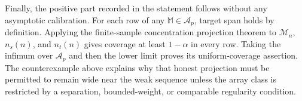Finally, the positive part recorded in the statement follows without any asymptotic calibration.  For each row of any \(\mathbb M\in\mathcal A_p\), target span holds by definition.  Applying the finite-sample concentration projection theorem to \(\mathcal M_n\), \(n_s(n)\), and \(n_t(n)\) gives coverage at least \(1-\alpha\) in every row.  Taking the infimum over \(\mathcal A_p\) and then the lower limit proves its uniform-coverage assertion.  The counterexample above explains why that honest projection must be permitted to remain wide near the weak sequence unless the array class is restricted by a separation, bounded-weight, or comparable regularity condition.